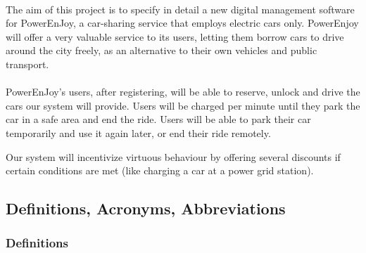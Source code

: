 \documentclass[english]{article}
\begin{document}
\paragraph{}
The aim of this project is to specify in detail a new digital management software for PowerEnJoy, a car-sharing service that employs electric cars only.
%
PowerEnjoy will offer a very valuable service to its users, letting them borrow cars to drive around the city freely, as an alternative to their own vehicles and public transport.

\paragraph{}
PowerEnJoy's users, after registering, will be able to reserve, unlock and drive the cars our system will provide. Users will be charged per minute until they park the car in a safe area and end the ride.
Users will be able to park their car temporarily and use it again later, or end their ride remotely.

Our system will incentivize virtuous behaviour by offering several discounts if certain conditions are met (like charging a car at a power grid station).


\newpage
\subsection{Definitions, Acronyms, Abbreviations}

\subsubsection{Definitions}
\end{document}
